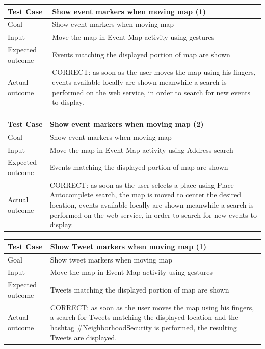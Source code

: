 \documentclass[a4paper]{scrreprt}
\begin{document}
\begin{tabularx}{\linewidth}{|l|X|}
	\hline
	\textbf{Test Case} 	& \textbf{Show event markers when moving map (1)} \\ \hline
	Goal 				& Show event markers when moving map \\ \hline
	Input 				& Move the map in Event Map activity using gestures\\ \hline
	Expected outcome 	& Events matching the displayed portion of map are shown \\ \hline
	Actual outcome 		& CORRECT: as soon as the user moves the map using his fingers, events available locally are shown meanwhile a search is performed on the web service, in order to search for new events to display. \\ \hline
\end{tabularx}
\bigskip
\noindent
\begin{tabularx}{\linewidth}{|l|X|}
	\hline
	\textbf{Test Case} 	& \textbf{Show event markers when moving map (2)} \\ \hline
	Goal 				& Show event markers when moving map \\ \hline
	Input 				& Move the map in Event Map activity using Address search\\ \hline
	Expected outcome 	& Events matching the displayed portion of map are shown \\ \hline
	Actual outcome 		& CORRECT: as soon as the user selects a place using Place Autocomplete search, the map is moved to center the desired location, events available locally are shown meanwhile a search is performed on the web service, in order to search for new events to display. \\ \hline
\end{tabularx}
\bigskip
\noindent
\begin{tabularx}{\linewidth}{|l|X|}
	\hline
	\textbf{Test Case} 	& \textbf{Show Tweet markers when moving map (1)} \\ \hline
	Goal 				& Show tweet markers when moving map \\ \hline
	Input 				& Move the map in Event Map activity using gestures\\ \hline
	Expected outcome 	& Tweets matching the displayed portion of map are shown \\ \hline
	Actual outcome 		& CORRECT: as soon as the user moves the map using his fingers, a search for Tweets matching the displayed location and the hashtag \#NeighborhoodSecurity is performed, the resulting Tweets are displayed. \\ \hline
\end{tabularx}
\end{document}
